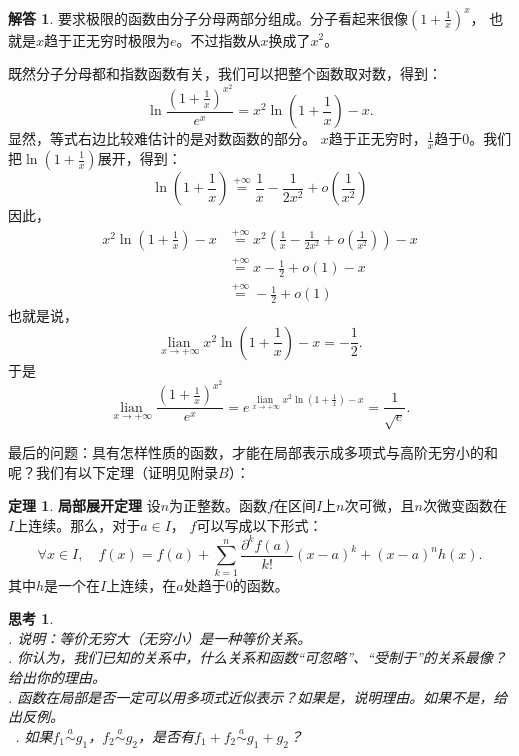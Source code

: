 \documentclass[12pt,UTF8]{ctexbook}
\newcommand{\lian}[1]{
    \underset{#1}{\operatorname{lian}\,}
}
\newcommand{\oveq}[1]{\overset{#1}{=}}
\newcommand{\olim}[1]{\mathit{o}\left(#1\right)}  %
\newcommand{\eqlim}[1]{\overset{#1}{\sim}}  %
\theoremstyle{definition}
\newtheorem{tm}{定理}[section]
\newtheorem*{so}{解答}
\theoremstyle{plain}
\newtheorem{sk}{思考}[section]
\begin{document}
\begin{so}
    要求极限的函数由分子分母两部分组成。分子看起来很像$\left(1 + \frac{1}{x}\right)^{x}$，
    也就是$x$趋于正无穷时极限为$e$。不过指数从$x$换成了$x^2$。

    既然分子分母都和指数函数有关，我们可以把整个函数取对数，得到：
    $$ \ln{\frac{\left(1 + \frac{1}{x}\right)^{x^2}}{e^x}} = x^2 \ln{\left(1 + \frac{1}{x}\right)} - x.$$
    显然，等式右边比较难估计的是对数函数的部分。
    $x$趋于正无穷时，$\frac{1}{x}$趋于$0$。我们把$\ln{\left(1 + \frac{1}{x}\right)}$展开，得到：
    $$ \ln{\left(1 + \frac{1}{x}\right)} \oveq{+\infty} \frac{1}{x} - \frac{1}{2x^2} + \olim{\frac{1}{x^2}}$$
    因此，
    \begin{align*}
        x^2 \ln{\left(1 + \frac{1}{x}\right)} - x &\oveq{+\infty} x^2 \left(\frac{1}{x} - \frac{1}{2x^2} + \olim{\frac{1}{x^2}}\right) - x  \\
        &\oveq{+\infty} x -\frac{1}{2} + \olim{1} - x  \\
        &\oveq{+\infty} -\frac{1}{2} + \olim{1} 
    \end{align*}
    也就是说，
    $$ \lian{x\to +\infty} x^2 \ln{\left(1 + \frac{1}{x}\right)} - x = -\frac{1}{2}. $$
    于是
    $$ \lian{x\to +\infty} \frac{\left(1 + \frac{1}{x}\right)^{x^2}}{e^x} = e^{\lian{x\to +\infty}  x^2 \ln{\left(1 + \frac{1}{x}\right)} - x} = \frac{1}{\sqrt{e}}. $$
\end{so}

最后的问题：具有怎样性质的函数，才能在局部表示成多项式与高阶无穷小的和呢？我们有以下定理（证明见附录$B$）：
\begin{tm}{\textbf{局部展开定理}}
    设$n$为正整数。函数$f$在区间$I$上$n$次可微，且$n$次微变函数在$I$上连续。那么，对于$a\in I$，
    $f$可以写成以下形式：
    $$ \forall x \in I , \quad f(x) = f(a) + \sum_{k=1}^n \frac{\partial^k f (a)}{k!}(x - a)^k + (x - a)^n h(x). $$
    其中$h$是一个在$I$上连续，在$a$处趋于$0$的函数。
\end{tm}

\begin{sk}
    \mbox{} \\
    . 说明：等价无穷大（无穷小）是一种等价关系。\\
    . 你认为，我们已知的关系中，什么关系和函数“可忽略”、“受制于”的关系最像？给出你的理由。\\
    . 函数在局部是否一定可以用多项式近似表示？如果是，说明理由。如果不是，给出反例。\\\
    . 如果$f_1 \eqlim{a} g_1$，$f_2\eqlim{a} g_2$，是否有$f_1 + f_2\eqlim{a} g_1 + g_2$？
\end{sk}
\end{document}
